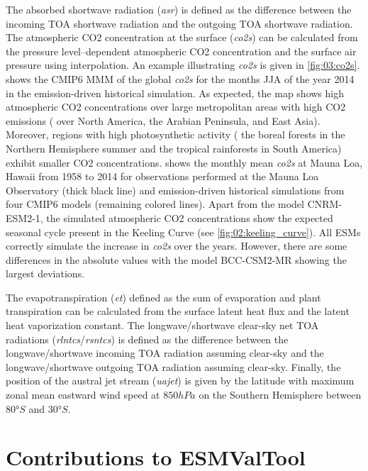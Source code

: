 The absorbed shortwave radiation (\emph{asr}) is defined as the difference
between the incoming \ac{TOA} shortwave radiation and the outgoing \ac{TOA}
shortwave radiation. The atmospheric \ac{CO2} concentration at the surface
(\emph{co2s}) can be calculated from the pressure level--dependent atmospheric
\ac{CO2} concentration and the surface air pressure using interpolation. An
example illustrating \emph{co2s} is given in \cref{fig:03:co2s}.
 shows the \acs{CMIP}6 \ac{MMM} of the global \emph{co2s}
for the months \acf{JJA} of the year 2014 in the emission-driven historical
simulation. As expected, the map shows high atmospheric \ac{CO2} concentrations
over large metropolitan areas with high \ac{CO2} emissions (\eg{} over North
America, the Arabian Peninsula, and East Asia). Moreover, regions with high
photosynthetic activity (\eg{} the boreal forests in the Northern Hemisphere
summer and the tropical rainforests in South America) exhibit smaller \ac{CO2}
concentrations.  shows the monthly mean \emph{co2s} at
Mauna Loa, Hawaii from 1958 to 2014 for observations performed at the Mauna Loa
Observatory \autocite{Keeling2005} (thick black line) and emission-driven
historical simulations from four \acs{CMIP}6 models (remaining colored lines).
Apart from the model CNRM-ESM2-1, the simulated atmospheric \ac{CO2}
concentrations show the expected seasonal cycle present in the Keeling Curve
(see \cref{fig:02:keeling_curve}). All \acp{ESM} correctly simulate the
increase in \emph{co2s} over the years. However, there are some differences in
the absolute values with the model BCC-CSM2-MR showing the largest deviations.

The evapotranspiration (\emph{et}) defined as the sum of evaporation and plant
transpiration can be calculated from the surface latent heat flux and the
latent heat vaporization constant. The longwave/shortwave clear-sky net
\ac{TOA} radiations (\emph{rlntcs}/\emph{rsntcs}) is defined as the difference
between the longwave/shortwave incoming \ac{TOA} radiation assuming clear-sky
and the longwave/shortwave outgoing \ac{TOA} radiation assuming clear-sky.
Finally, the position of the austral jet stream (\emph{uajet}) is given by the
latitude with maximum zonal mean eastward wind speed at $850 \unit{hPa}$ on the
Southern Hemisphere between $80 \unit{\degree S}$ and $30 \unit{\degree S}$.


\section{Contributions to \acs{ESMValTool}}
\label{sec:03:contributions_to_esmvaltool}

